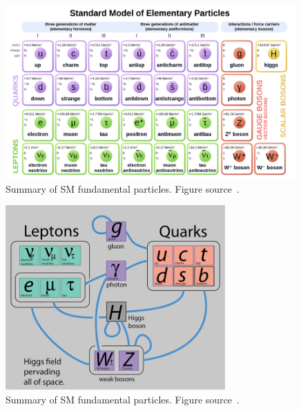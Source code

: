 

\begin{figure}[t!]
\centering
\includegraphics[width=0.99\textwidth]{figures/SM_include_antimatter.png}
\caption[The particles of the SM]{Summary of SM fundamental particles. Figure source~\cite{SMtable}.
\label{fig:SMParticles}}
\end{figure}

\begin{figure}[t!]
\centering
\includegraphics[width=0.75\textwidth]{figures/interactions_SM.png}
\caption[The SM particles and their interactions]{Summary of SM fundamental particles. Figure source~\cite{Particle_interactions}.
\label{fig:SMinteractions}}
\end{figure}
